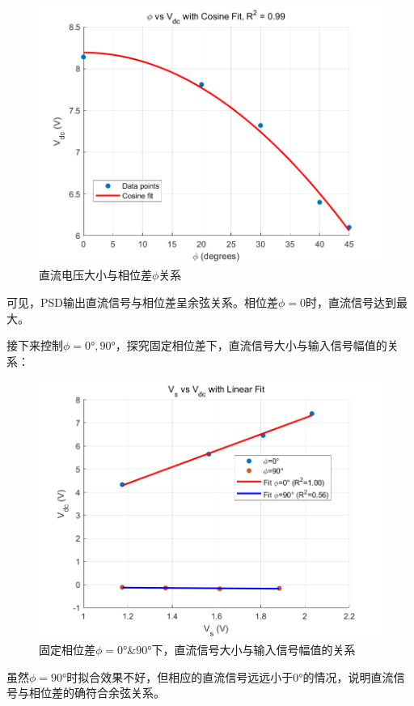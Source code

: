 \documentclass[12pt,a4paper]{article}
\begin{document}
\begin{figure}[H]
    \centering
    \includegraphics[width=\textwidth]{phi_vs_Vdc_cosine_fit.png}
    \caption{直流电压大小与相位差$\phi$关系}
    \label{fig:phi-vs-Vdc-cosine-fit}
    \end{figure}
可见，PSD输出直流信号与相位差呈余弦关系。相位差$\phi=0$时，直流信号达到最大。

接下来控制$\phi=0°,90°$，探究固定相位差下，直流信号大小与输入信号幅值的关系：
\begin{figure}[H]
    \centering
    \includegraphics[width=\textwidth]{Vs_vs_Vdc_linear_fit.png}
    \caption{固定相位差$\phi=0°\&90°$下，直流信号大小与输入信号幅值的关系}
    \label{fig:Vs-vs-Vdc-linear-fit}
    \end{figure}
虽然$\phi=90°$时拟合效果不好，但相应的直流信号远远小于0°的情况，说明直流信号与相位差的确符合余弦关系。
\end{document}
